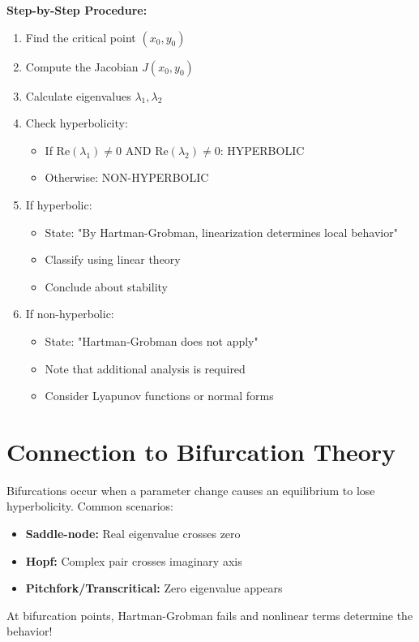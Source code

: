\documentclass[12pt]{article}
\begin{document}
\begin{mdframed}[linecolor=black, linewidth=1pt]
\textbf{Step-by-Step Procedure:}
\begin{enumerate}
    \item Find the critical point $(x_0, y_0)$
    \item Compute the Jacobian $J(x_0, y_0)$
    \item Calculate eigenvalues $\lambda_1, \lambda_2$
    \item Check hyperbolicity:
    \begin{itemize}
        \item If $\text{Re}(\lambda_1) \neq 0$ AND $\text{Re}(\lambda_2) \neq 0$: HYPERBOLIC
        \item Otherwise: NON-HYPERBOLIC
    \end{itemize}
    \item If hyperbolic:
    \begin{itemize}
        \item State: "By Hartman-Grobman, linearization determines local behavior"
        \item Classify using linear theory
        \item Conclude about stability
    \end{itemize}
    \item If non-hyperbolic:
    \begin{itemize}
        \item State: "Hartman-Grobman does not apply"
        \item Note that additional analysis is required
        \item Consider Lyapunov functions or normal forms
    \end{itemize}
\end{enumerate}
\end{mdframed}

\section{Connection to Bifurcation Theory}

\begin{insight}
Bifurcations occur when a parameter change causes an equilibrium to lose hyperbolicity. Common scenarios:
\begin{itemize}
    \item \textbf{Saddle-node:} Real eigenvalue crosses zero
    \item \textbf{Hopf:} Complex pair crosses imaginary axis
    \item \textbf{Pitchfork/Transcritical:} Zero eigenvalue appears
\end{itemize}
At bifurcation points, Hartman-Grobman fails and nonlinear terms determine the behavior!
\end{insight}
\end{document}
